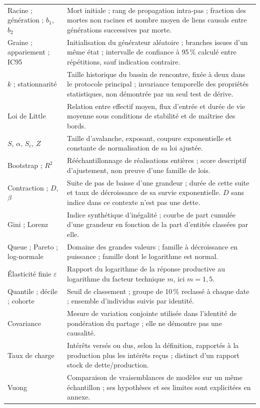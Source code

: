 \begin{small}
\begin{longtable}{@{}>{\raggedright\arraybackslash}p{.27\linewidth}p{.66\linewidth}@{}}
Racine ; génération ; $b_1$, $b_2$ & Mort initiale ; rang de propagation
intra-pas ; fraction des mortes non racines et nombre moyen de liens
causals entre générations successives par morte. \\
Graine ; appariement ; IC95 & Initialisation du générateur aléatoire ;
branches issues d'un même état ; intervalle de confiance à 95\,\%
calculé entre répétitions, sauf indication contraire. \\
$k$ ; stationnarité & Taille historique du bassin de rencontre, fixée
à deux dans le protocole principal ; invariance temporelle des propriétés
statistiques, non démontrée par un seul test de dérive. \\
Loi de Little & Relation entre effectif moyen, flux d'entrée et durée
de vie moyenne sous conditions de stabilité et de maîtrise des bords. \\
$S$, $\alpha$, $S_c$, $Z$ & Taille d'avalanche, exposant, coupure
exponentielle et constante de normalisation de sa loi ajustée. \\
Bootstrap ; $R^2$ & Rééchantillonnage de réalisations entières ;
score descriptif d'ajustement, non preuve d'une famille de lois. \\
Contraction ; $D$, $\beta$ & Suite de pas de baisse d'une grandeur ;
durée de cette suite et taux de décroissance de sa survie exponentielle.
$D$ sans indice dans ce contexte n'est pas une dette. \\
Gini ; Lorenz & Indice synthétique d'inégalité ; courbe de part cumulée
d'une grandeur en fonction de la part d'entités classées par elle. \\
Queue ; Pareto ; log-normale & Domaine des grandes valeurs ; famille
à décroissance en puissance ; famille dont le logarithme est normal. \\
Élasticité finie $\varepsilon$ & Rapport du logarithme de la réponse
productive au logarithme du facteur technique $m$, ici $m=1{,}5$. \\
Quantile ; décile ; cohorte & Seuil de classement ; groupe de 10\,\%
reclassé à chaque date ; ensemble d'individus suivis par identité. \\
Covariance & Mesure de variation conjointe utilisée dans l'identité
de pondération du partage ; elle ne démontre pas une causalité. \\
Taux de charge & Intérêts versés ou dus, selon la définition,
rapportés à la production plus les intérêts reçus ; distinct d'un
rapport stock de dette/production. \\
Vuong & Comparaison de vraisemblances de modèles sur un même
échantillon ; ses hypothèses et ses limites sont explicitées en annexe. \\
\bottomrule
\end{longtable}
\end{small}
